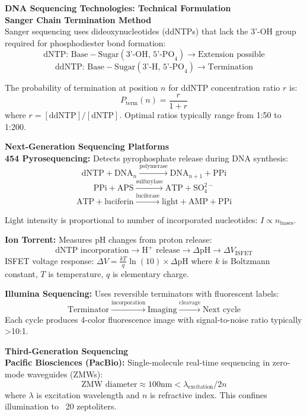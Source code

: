 \begin{technical}
{\Large\textbf{DNA Sequencing Technologies: Technical Formulation}}\\[0.7em]

\textbf{Sanger Chain Termination Method}\\[0.5em]
Sanger sequencing uses dideoxynucleotides (ddNTPs) that lack the 3'-OH group required for phosphodiester bond formation:
$$
\text{dNTP: } \text{Base}-\text{Sugar}(\text{3'-OH, 5'-PO}_4) \rightarrow \text{Extension possible}
$$
$$
\text{ddNTP: } \text{Base}-\text{Sugar}(\text{3'-H, 5'-PO}_4) \rightarrow \text{Termination}
$$

The probability of termination at position $n$ for ddNTP concentration ratio $r$ is:
$$
P_{\text{term}}(n) = \frac{r}{1+r}
$$
where $r = [\text{ddNTP}]/[\text{dNTP}]$. Optimal ratios typically range from 1:50 to 1:200.

\textbf{Next-Generation Sequencing Platforms}\\[0.5em]

\textbf{454 Pyrosequencing:} Detects pyrophosphate release during DNA synthesis:
$$
\text{dNTP} + \text{DNA}_n \xrightarrow{\text{polymerase}} \text{DNA}_{n+1} + \text{PPi}
$$
$$
\text{PPi} + \text{APS} \xrightarrow{\text{sulfurylase}} \text{ATP} + \text{SO}_4^{2-}
$$
$$
\text{ATP} + \text{luciferin} \xrightarrow{\text{luciferase}} \text{light} + \text{AMP} + \text{PPi}
$$

Light intensity is proportional to number of incorporated nucleotides: $I \propto n_{\text{bases}}$.

\textbf{Ion Torrent:} Measures pH changes from proton release:
$$
\text{dNTP incorporation} \rightarrow \text{H}^+ \text{ release} \rightarrow \Delta\text{pH} \rightarrow \Delta V_{\text{ISFET}}
$$
ISFET voltage response: $\Delta V = \frac{kT}{q} \ln(10) \times \Delta\text{pH}$ where $k$ is Boltzmann constant, $T$ is temperature, $q$ is elementary charge.

\textbf{Illumina Sequencing:} Uses reversible terminators with fluorescent labels:
$$
\text{Terminator} \xrightarrow{\text{incorporation}} \text{Imaging} \xrightarrow{\text{cleavage}} \text{Next cycle}
$$
Each cycle produces 4-color fluorescence image with signal-to-noise ratio typically >10:1.

\textbf{Third-Generation Sequencing}\\[0.5em]

\textbf{Pacific Biosciences (PacBio):} Single-molecule real-time sequencing in zero-mode waveguides (ZMWs):
$$
\text{ZMW diameter} \approx 100\text{nm} < \lambda_{\text{excitation}}/2n
$$
where $\lambda$ is excitation wavelength and $n$ is refractive index. This confines illumination to ~20 zeptoliters.


\end{technical}
